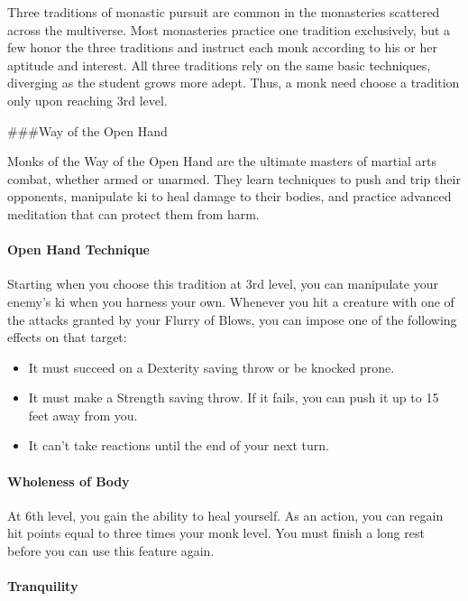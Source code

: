 \documentclass[
]{article}
\providecommand{\tightlist}{%
  \setlength{\itemsep}{0pt}\setlength{\parskip}{0pt}}
\begin{document}
Three traditions of monastic pursuit are common in the monasteries
scattered across the multiverse. Most monasteries practice one tradition
exclusively, but a few honor the three traditions and instruct each monk
according to his or her aptitude and interest. All three traditions rely
on the same basic techniques, diverging as the student grows more adept.
Thus, a monk need choose a tradition only upon reaching 3rd level.

\#\#\#Way of the Open Hand

Monks of the Way of the Open Hand are the ultimate masters of martial
arts combat, whether armed or unarmed. They learn techniques to push and
trip their opponents, manipulate ki to heal damage to their bodies, and
practice advanced meditation that can protect them from harm.

\hypertarget{open-hand-technique}{%
\paragraph{Open Hand Technique}\label{open-hand-technique}}

Starting when you choose this tradition at 3rd level, you can manipulate
your enemy's ki when you harness your own. Whenever you hit a creature
with one of the attacks granted by your Flurry of Blows, you can impose
one of the following effects on that target:

\begin{itemize}
\tightlist
\item
  It must succeed on a Dexterity saving throw or be knocked prone.
\item
  It must make a Strength saving throw. If it fails, you can push it up
  to 15 feet away from you.
\item
  It can't take reactions until the end of your next turn.
\end{itemize}

\hypertarget{wholeness-of-body}{%
\paragraph{Wholeness of Body}\label{wholeness-of-body}}

At 6th level, you gain the ability to heal yourself. As an action, you
can regain hit points equal to three times your monk level. You must
finish a long rest before you can use this feature again.

\hypertarget{tranquility}{%
\paragraph{Tranquility}\label{tranquility}}
\end{document}

